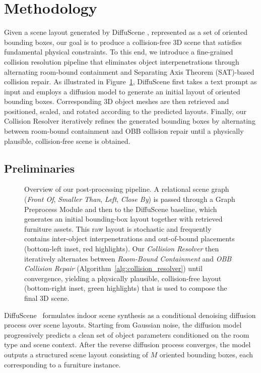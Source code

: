 
\section{Methodology}
\label{sec:method}

Given a scene layout generated by DiffuScene \cite{tang2024diffuscenedenoisingdiffusionmodels}, represented as a set of oriented bounding boxes, our goal is to produce a collision-free 3D scene that satisfies fundamental physical constraints. To this end, we introduce a fine-grained collision resolution pipeline that eliminates object interpenetrations through alternating room-bound containment and Separating Axis Theorem (SAT)-based collision repair. As illustrated in Figure~\ref{fig:pipeline}, DiffuScene first takes a text prompt as input and employs a diffusion model to generate an initial layout of oriented bounding boxes. Corresponding 3D object meshes are then retrieved and positioned, scaled, and rotated according to the predicted layouts. Finally, our Collision Resolver iteratively refines the generated bounding boxes by alternating between room-bound containment and OBB collision repair until a physically plausible, collision-free scene is obtained.



\subsection{Preliminaries}
\label{sec:method:prelim}
\begin{figure}[t]
    \centering
    
    \caption{Overview of our post-processing pipeline. A relational scene graph (\emph{Front Of}, \emph{Smaller Than}, \emph{Left}, \emph{Close By}) is passed through a Graph Preprocess Module and then to the DiffuScene baseline, which generates an initial bounding-box layout together with retrieved furniture assets. This raw layout is stochastic and frequently contains inter-object interpenetrations and out-of-bound placements (bottom-left inset, red highlights). Our \emph{Collision Resolver} then iteratively alternates between \emph{Room-Bound Containment} and \emph{OBB Collision Repair} (Algorithm~\ref{alg:collision_resolver}) until convergence, yielding a physically plausible, collision-free layout (bottom-right inset, green highlights) that is used to compose the final 3D scene.}
    \label{fig:pipeline}
\end{figure}
DiffuScene~\cite{tang2024diffuscenedenoisingdiffusionmodels} formulates indoor scene synthesis as a conditional denoising diffusion process over scene layouts. Starting from Gaussian noise, the diffusion model progressively predicts a clean set of object parameters conditioned on the room type and scene context. After the reverse diffusion process converges, the model outputs a structured scene layout consisting of $M$ oriented bounding boxes, each corresponding to a furniture instance.

